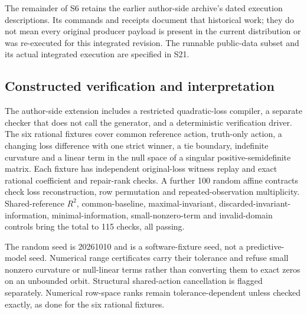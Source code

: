 \documentclass[11pt]{article}
\begin{document}
The remainder of S6 retains the earlier author-side archive's dated execution descriptions. Its commands and receipts document that historical work; they do not mean every original producer payload is present in the current distribution or was re-executed for this integrated revision. The runnable public-data subset and its actual integrated execution are specified in S21.

\subsection{Constructed verification and interpretation}
The author-side extension includes a restricted quadratic-loss compiler, a separate checker that does not call the generator, and a deterministic verification driver. The six rational fixtures cover common reference action, truth-only action, a changing loss difference with one strict winner, a tie boundary, indefinite curvature and a linear term in the null space of a singular positive-semidefinite matrix. Each fixture has independent original-loss witness replay and exact rational coefficient and repair-rank checks. A further 100 random affine contracts check loss reconstruction, row permutation and repeated-observation multiplicity. Shared-reference $R^2$, common-baseline, maximal-invariant, discarded-invariant-information, minimal-information, small-nonzero-term and invalid-domain controls bring the total to 115 checks, all passing.

The random seed is 20261010 and is a software-fixture seed, not a predictive-model seed. Numerical range certificates carry their tolerance and refuse small nonzero curvature or null-linear terms rather than converting them to exact zeros on an unbounded orbit. Structural shared-action cancellation is flagged separately. Numerical row-space ranks remain tolerance-dependent unless checked exactly, as done for the six rational fixtures.
\end{document}

